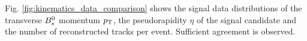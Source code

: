 
Fig. \ref{fig:kinematics_data_comparison} shows the signal data distributions of the transverse ${{B}^0_{s}}$ momentum $\mbox{$p_{\mathrm{ T}}$}$, the pseudorapidity $\eta$ of the signal candidate and the number of reconstructed tracks per event.
Sufficient agreement is observed.



